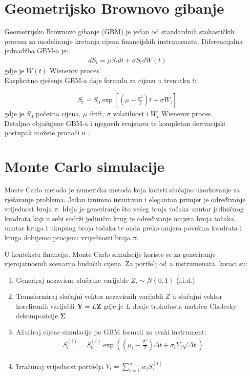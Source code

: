 \documentclass[zavrsnirad]{fer}
\begin{document}
\section{Geometrijsko Brownovo gibanje}
\label{sek:gbm}
Geometrijsko Brownovo gibanje (GBM) je jedan od standardnih
stohastičkih procesa za modeliranje kretanja cijena financijskih instrumenata.
Diferencijalna jednadžba GBM-a je:
\begin{align*}
    dS_t = \mu S_t dt + \sigma S_t dW\left(t\right)
\end{align*}
\indent gdje je $W\left(t\right)$ Wienerov proces.\\
Eksplicitno rješenje GBM-a daje formulu za cijenu u trenutku $t$:

\begin{align*}
S_t = S_0 \exp\left[\left(\mu - \frac{\sigma^2}{2}\right)t +
    \sigma W_t\right]
\end{align*}
\indent gdje je $S_0$ početna cijena, $\mu$ drift, $\sigma$ volatilnost i $W_t$
Wienerov proces.\\
Detaljno objašnjene GBM-a i njegovih svojstava te kompletan derivacijski
postupak možete pronaći u \cite{GMBIzvod}.

\section{Monte Carlo simulacije}
\label{sek:monte_carlo}
Monte Carlo metoda je numerička metoda koja koristi slučajno
uzorkovanje za rješavanje problema.
Jedan iznimno intuitivan i elegantan primjer je određivanje
vrijednost broja $\pi$.
Ideja je generiranje što većeg broja točaka unutar jediničnog
kvadrata koji u sebi sadrži jedinični krug te određivanje
omjera broja točaka unutar kruga i ukupnog broja točaka te onda
preko omjera površina kvadrata i kruga dobijemo procjenu vrijednosti
broja $\pi$.

U kontekstu financija, Monte Carlo simulacije koriste se za
generiranje vjerojatnosnih scenarija budućih cijena.
Za portfelj od $n$ instrumenata, koraci su:
\begin{enumerate}
    \item Generiraj nezavisne slučajne varijable $Z_i \sim N(0,1)$ (i.i.d.)
\item Transformiraj slučajni vektor nezavisnih varijabli $Z$ u
    slučajni vektor koreliranih varijabli $\mathbf{Y} = L\mathbf{Z}$
    gdje je $L$ donje trokutasta matrica Cholesky
        dekompozicije $\boldsymbol{\Sigma}$
\item Ažuriraj cijene simulacije po GBM formuli za svaki instrument:
\begin{align*}
S_t^{(i)} = S_0^{(i)} \exp\left(\left(\mu_i - \frac{\sigma_i^2}{2}\right)\Delta t + \sigma_i Y_i \sqrt{\Delta t}\right)
\end{align*}
\item Izračunaj vrijednost portfelja $V_t = \sum_{i=1}^n w_i S_t^{(i)}$
\end{enumerate}
\end{document}

